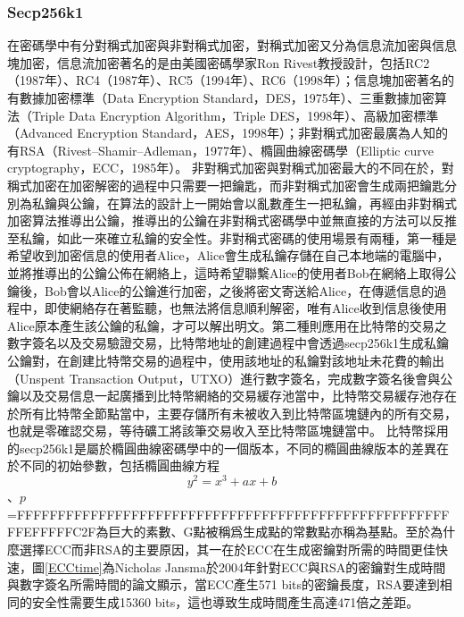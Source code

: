 				\subsubsection{Secp256k1}
				在密碼學中有分對稱式加密與非對稱式加密，對稱式加密又分為信息流加密與信息塊加密，信息流加密著名的是由美國密碼學家Ron Rivest教授設計，包括RC2（1987年）\supercite{OnthedesignandsecurityofRC2}、RC4（1987年）\supercite{Rc4}、RC5（1994年）\supercite{TheRC5encryptionalgorithm}、RC6（1998年）\supercite{TheRC6blockcipher.v1.1August201998}；信息塊加密著名的有數據加密標準（Data Encryption Standard，DES，1975年）\supercite{Dataencryptionstandard}、三重數據加密算法（Triple Data Encryption Algorithm，Triple DES，1998年）\supercite{TrippleDataEncryptionAlgorithmModesofOperation}、高級加密標準（Advanced Encryption Standard，AES，1998年）\supercite{ThedesignofRijndael:AES-theadvancedencryptionstandard}；非對稱式加密最廣為人知的有RSA（Rivest–Shamir–Adleman，1977年）\supercite{Cryptographiccommunicationssystemandmethod}、橢圓曲線密碼學（Elliptic curve cryptography，ECC，1985年）\supercite{Ellipticcurvecryptosystems}。
				非對稱式加密與對稱式加密最大的不同在於，對稱式加密在加密解密的過程中只需要一把鑰匙，而非對稱式加密會生成兩把鑰匙分別為私鑰與公鑰，在算法的設計上一開始會以亂數產生一把私鑰，再經由非對稱式加密算法推導出公鑰，推導出的公鑰在非對稱式密碼學中並無直接的方法可以反推至私鑰，如此一來確立私鑰的安全性。非對稱式密碼的使用場景有兩種，第一種是希望收到加密信息的使用者Alice，Alice會生成私鑰存儲在自己本地端的電腦中，並將推導出的公鑰公佈在網絡上，這時希望聯繫Alice的使用者Bob在網絡上取得公鑰後，Bob會以Alice的公鑰進行加密，之後將密文寄送給Alice，在傳遞信息的過程中，即使網絡存在著監聽，也無法將信息順利解密，唯有Alice收到信息後使用Alice原本產生該公鑰的私鑰，才可以解出明文。第二種則應用在比特幣的交易之數字簽名以及交易驗證交易，比特幣地址的創建過程中會透過secp256k1生成私鑰公鑰對，在創建比特幣交易的過程中，使用該地址的私鑰對該地址未花費的輸出（Unspent Transaction Output，UTXO）進行數字簽名，完成數字簽名後會與公鑰以及交易信息一起廣播到比特幣網絡的交易緩存池當中，比特幣交易緩存池存在於所有比特幣全節點當中，主要存儲所有未被收入到比特幣區塊鏈內的所有交易，也就是零確認交易，等待礦工將該筆交易收入至比特幣區塊鏈當中。
				比特幣採用的secp256k1是屬於橢圓曲線密碼學中的一個版本，不同的橢圓曲線版本的差異在於不同的初始參數，包括橢圓曲線方程$$y^2=x^3+ax+b$$、$p$=FFFFFFFFFFFFFFFFFFFFFFFFFFFFFFFFFFFFFFFFFFFFFFFFFFFFFFFEFFFFFC2F為巨大的素數、G點被稱爲⽣成點的常數點亦稱為基點。至於為什麼選擇ECC而非RSA的主要原因，其一在於ECC在生成密鑰對所需的時間更佳快速，圖\ref{ECCtime}為Nicholas Jansma於2004年針對ECC與RSA的密鑰對生成時間與數字簽名所需時間的論文\supercite{Performancecomparisonofellipticcurveandrsadigitalsignatures}顯示，當ECC產生571 bits的密鑰長度，RSA要達到相同的安全性需要生成15360 bits，這也導致生成時間產生高達471倍之差距。
				
